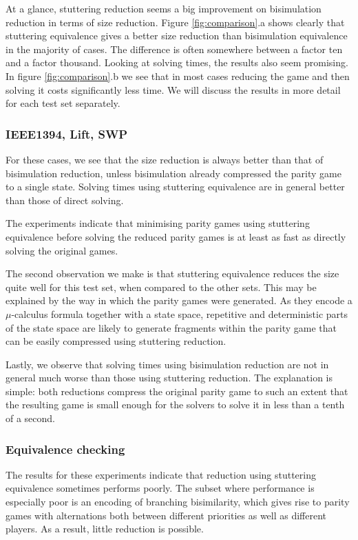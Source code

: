 \documentclass[a4paper]{llncs}
\begin{document}
At a glance, stuttering reduction seems a big improvement on bisimulation 
reduction in terms of size reduction. Figure \ref{fig:comparison}.a shows 
clearly that stuttering equivalence gives a better size reduction than 
bisimulation equivalence in the majority of cases. The difference is often 
somewhere between a factor ten and a factor thousand. Looking at solving times, 
the results also seem promising. In figure \ref{fig:comparison}.b we see that 
in most cases reducing the game and then solving it costs significantly less 
time. We will discuss the results in more detail for each test set separately.

\subsubsection{IEEE1394, Lift, SWP}

For these cases, we see that the size reduction is always better than that of
bisimulation reduction, unless bisimulation already compressed the parity game
to a single state. Solving times using stuttering equivalence are in general 
better than those of direct solving.

The experiments indicate
that minimising parity games using stuttering equivalence before solving
the reduced parity games is at least as fast as directly solving the
original games.

The second observation we make is that stuttering equivalence reduces the size
quite well for this test set, when compared to the other sets. This may be 
explained by the way in which the parity games were generated. As they encode
a $\mu$-calculus formula together with a state space, repetitive and 
deterministic parts of the state space are likely to generate fragments within
the parity game that can be easily compressed using stuttering reduction.

Lastly, we observe that solving times using bisimulation reduction are not
in general much worse than those using stuttering reduction. The explanation is
simple: both reductions compress the original parity game to such an extent that
the resulting game is small enough for the solvers to solve it in less than a 
tenth of a second.

\subsubsection{Equivalence checking}

The results for these experiments indicate that reduction using stuttering
equivalence sometimes performs poorly. The subset where performance is
especially poor is an encoding of branching bisimilarity, which gives rise to
parity games with alternations both between different priorities as well as
different players. As a result, little reduction is possible.
\end{document}
